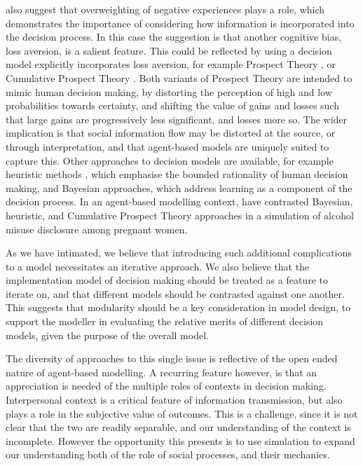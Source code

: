 \documentclass{article}
\begin{document}
\citeauthor{McKenzie2013} also suggest that overweighting of negative experiences plays a role, which demonstrates the importance of considering how information is incorporated into the decision process. In this case the suggestion is that another cognitive bias, loss aversion, is a salient feature. This could be reflected by using a decision model explicitly incorporates loss aversion, for example Prospect Theory \citep{Kahneman1979}, or Cumulative Prospect Theory \citep{Tversky1992}. Both variants of Prospect Theory are intended to mimic human decision making, by distorting the perception of high and low probabilities towards certainty, and shifting the value of gains and losses such that large gains are progressively less significant, and losses more so. 
The wider implication is that social information flow may be distorted at the source, or through interpretation, and that agent-based models are uniquely suited to capture this.  Other approaches to decision models are available, for example heuristic methods \citep{Gigerenzer1996}, which emphasise the bounded rationality of human decision making, and Bayesian approaches, which address learning as a component of the decision process. In an agent-based modelling context, \citet{Gray2016} have contrasted Bayesian, heuristic, and Cumulative Prospect Theory approaches in a simulation of alcohol misuse disclosure among pregnant women.

As we have intimated, we believe that introducing such additional complications to a model necessitates an iterative approach. We also believe that the implementation model of decision making should be treated as a feature to iterate on, and that different models should be contrasted against one another. This suggests that modularity should be a key consideration in model design, to support the modeller in evaluating the relative merits of different decision models, given the purpose of the overall model.

The diversity of approaches to this single issue is reflective of the open ended nature of agent-based modelling. A recurring feature however, is that an appreciation is needed of the multiple roles of contexts in decision making. Interpersonal context is a critical feature of information transmission, but also plays a role in the subjective value of outcomes. This is a challenge, since it is not clear that the two are readily separable, and our understanding of the context is incomplete. 
However the opportunity this presents is to use simulation to expand our understanding both of the role of social processes, and their mechanics.
\end{document}
